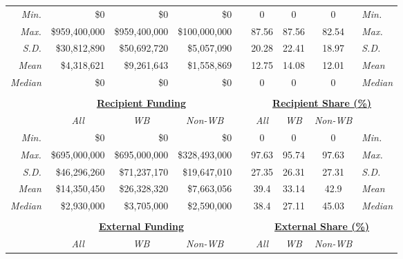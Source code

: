 \documentclass{article}
\begin{document}
\begin{singlespace}
\begin{table}[H]
{\begin{tabular}{rrrrlcccl}
		\textit{Min.} & \$0 & \$0 & \$0 &  & 0 & 0 & 0 & \textit{Min.} \\
		\textit{Max.} & \$959,400,000 & \$959,400,000 & \$100,000,000 &  & 87.56 & 87.56 & 82.54 & \textit{Max.} \\
		\textit{S.D.} & \$30,812,890 & \$50,692,720 & \$5,057,090 &  & 20.28 & 22.41 & 18.97 & \textit{S.D.} \\
		\textit{Mean} & \$4,318,621 & \$9,261,643 & \$1,558,869 &  & 12.75 & 14.08 & 12.01 & \textit{Mean} \\
		\textit{Median} & \$0 & \$0 & \$0 &  & 0 & 0 & 0 & \textit{Median} \\ \hline
		\multicolumn{1}{l}{} & \multicolumn{1}{l}{} & \multicolumn{1}{l}{} & \multicolumn{1}{l}{} &  & \multicolumn{1}{l}{} & \multicolumn{1}{l}{} & \multicolumn{1}{l}{} &  \\
		\textit{} & \multicolumn{3}{c}{{\ul \textbf{Recipient Funding}}} &  & \multicolumn{4}{c}{{\ul \textbf{Recipient Share (\%)}}} \\
		\multicolumn{1}{c}{\textit{}} & \multicolumn{1}{c}{\textit{All}} & \multicolumn{1}{c}{\textit{WB}} & \multicolumn{1}{c}{\textit{Non-WB}} & \multicolumn{1}{c}{\textit{}} & \textit{All} & \textit{WB} & \textit{Non-WB} & \multicolumn{1}{c}{\textit{}} \\
		\textit{Min.} & \$0 & \$0 & \$0 &  & 0 & 0 & 0 & \textit{Min.} \\
		\textit{Max.} & \$695,000,000 & \$695,000,000 & \$328,493,000 &  & 97.63 & 95.74 & 97.63 & \textit{Max.} \\
		\textit{S.D.} & \$46,296,260 & \$71,237,170 & \$19,647,010 &  & 27.35 & 26.31 & 27.31 & \textit{S.D.} \\
		\textit{Mean} & \$14,350,450 & \$26,328,320 & \$7,663,056 &  & 39.4 & 33.14 & 42.9 & \textit{Mean} \\
		\textit{Median} & \$2,930,000 & \$3,705,000 & \$2,590,000 &  & 38.4 & 27.11 & 45.03 & \textit{Median} \\ \hline
		\multicolumn{1}{l}{} & \multicolumn{1}{l}{} & \multicolumn{1}{l}{} & \multicolumn{1}{l}{} &  & \multicolumn{1}{l}{} & \multicolumn{1}{l}{} & \multicolumn{1}{l}{} &  \\
		\textit{} & \multicolumn{3}{c}{{\ul \textbf{External Funding}}} &  & \multicolumn{4}{c}{{\ul \textbf{External Share (\%)}}} \\
		\textit{} & \multicolumn{1}{c}{\textit{All}} & \multicolumn{1}{c}{\textit{WB}} & \multicolumn{1}{c}{\textit{Non-WB}} &  & \textit{All} & \textit{WB} & \textit{Non-WB} & \textit{} \\

\end{tabular}}
\end{table}
\end{singlespace}
\end{document}
